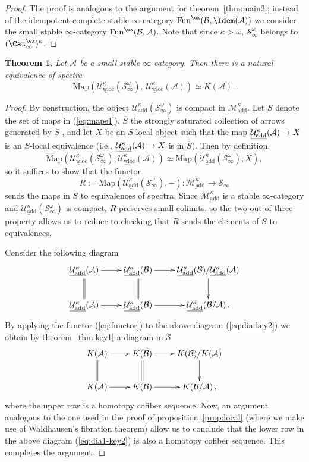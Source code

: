 \documentclass{amsart}
\renewcommand{\to}{\mathchoice{\longrightarrow}{\rightarrow}{\rightarrow}{\rightarrow}}
\newcommand{\cA}{{\mathcal A}}
\newcommand{\cB}{{\mathcal B}}
\newcommand{\cM}{{\mathcal M}}
\newcommand{\cU}{{\mathcal U}}
\let\catsymbfont\mathcal
\newcommand{\aA}{{\catsymbfont{A}}}
\newcommand{\aS}{{\catsymbfont{S}}}
\newcommand{\stabcat}{\Cat_\i^{\ex}}
\newcommand{\idemfun}{\Fun^{\ex}}
\newcommand{\Fun}{\mathrm{Fun}} %
\newcommand{\Map}{\mathrm{Map}}%
\newcommand{\ispec}{\aS_{\infty}}
\newcommand{\Spt}{\mathcal{S}}%
\newcommand{\too}{\longrightarrow}%
\renewcommand{\i}{\infty}
\newcommand{\uMotadd}{\underline{\cM_{\mathrm{add}}^\kappa}}
\newcommand{\uUmot}{\underline{\cU_{\mathrm{add}}^\kappa}}
\newcommand{\uwUloc}{\underline{\cU_{\mathrm{wloc}}^\kappa}}
\numberwithin{equation}{section}
\newtheorem{theorem}[equation]{Theorem}
\theoremstyle{definition}
\begin{document}
\begin{proof}
The proof is analogous to the argument for theorem~\ref{thm:main2};
instead of the idempotent-complete stable $\i$-category
$\idemfun(\cB, \Idem(\cA))$ we consider the small stable 
$\i$-category $\idemfun(\cB, \cA)$.  Note that since
$\kappa > \omega$, $\ispec^\omega$ belongs to $(\stabcat)^\kappa$.
\end{proof}

\begin{theorem}\label{thm:key2}
Let $\cA$ be a small stable $\i$-category.  Then there is a natural
equivalence of spectra
\[\Map(\uwUloc(\ispec^\omega),\,\uwUloc(\aA)) \simeq K(\aA)\,.\]
\end{theorem}

\begin{proof}
By construction, the object $\uUmot(\ispec^\omega)$ is compact in
$\uMotadd$.  Let $S$ denote the set of maps in (\ref{eq:maps1}),
$\overline{S}$ the strongly saturated collection of arrows generated
by $S$ \cite[5.5.4.5]{HTT}, and let $X$ be an $S$-local
object such that the map $\uUmot(\aA)\to X$ is an $S$-local
equivalence (i.e., $\uUmot(\aA)\to X$ is in $\overline{S}$).
Then by definition,
\[
\Map(\uwUloc(\ispec^\omega),\uwUloc(\aA))\simeq\Map(\uUmot(\ispec^\omega),X),\]
so it suffices to show that the functor
\begin{equation}\label{eq:functor}
R:=\Map(\uUmot(\ispec^\omega), -): \uMotadd \too \ispec
\end{equation}
sends the maps in $\overline{S}$ to equivalences of
spectra.  Since $\uMotadd$ is a stable $\i$-category and
$\uUmot(\ispec^\omega)$ is compact, $R$ preserves small colimits,
so the two-out-of-three property allows us to reduce to checking that
$R$ sends the elements of $S$ to equivalences.

Consider the following diagram
\begin{equation}\label{eq:dia-key2}
\xymatrix{
\uUmot(\cA) \ar[r] \ar@{=}[d] & \uUmot(\cB) \ar[r] \ar@{=}[d] &  \uUmot(\cB)/\uUmot(\cA) \ar[d] \\
\uUmot(\cA) \ar[r] & \uUmot(\cB) \ar[r] & \uUmot(\cB/\cA)\,.
}
\end{equation}
By applying the functor (\ref{eq:functor}) to the above diagram
(\ref{eq:dia-key2}) we obtain by theorem~\ref{thm:key1} a diagram in
$\Spt$
\begin{equation}\label{eq:dia1-key2}
\xymatrix{
K(\cA) \ar[r] \ar@{=}[d] & K(\cB) \ar[r] \ar@{=}[d] &  K(\cB)/K(\cA) \ar[d] \\
K(\cA) \ar[r] & K(\cB) \ar[r] & K(\cB/\cA)\,,
}
\end{equation}
where the upper row is a homotopy cofiber sequence. Now, an
argument analogous to the one used in the proof of
proposition~\ref{prop:local} (where we make use of Waldhausen's
fibration theorem) allow us to conclude that the lower row in the
above diagram (\ref{eq:dia1-key2}) is also a homotopy
cofiber sequence.  This completes the argument.
\end{proof}
\end{document}
